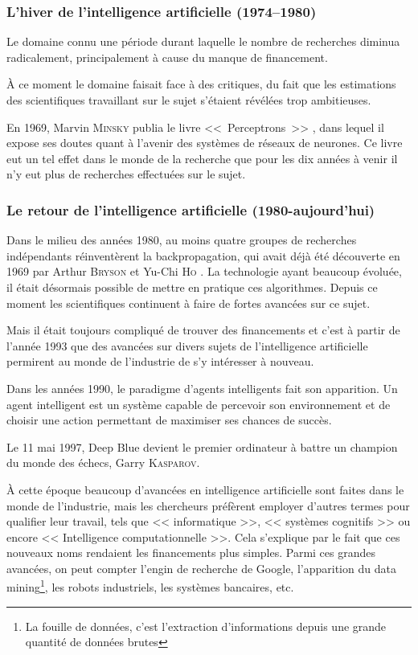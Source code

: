 \subsubsection{L'hiver de l'intelligence artificielle (1974–1980)}

Le domaine connu une période durant laquelle le nombre de recherches diminua radicalement, principalement à cause du manque de financement.

À ce moment le domaine faisait face à des critiques, du fait que les estimations des scientifiques travaillant sur le sujet s'étaient révélées trop ambitieuses.

En 1969, Marvin \textsc{Minsky} publia le livre <<~Perceptrons~>> \cite{perceptrons}, dans lequel il expose ses doutes quant à l'avenir des systèmes de réseaux de neurones.
Ce livre eut un tel effet dans le monde de la recherche que pour les dix années à venir il n'y eut plus de recherches effectuées sur le sujet.

\subsubsection{Le retour de l'intelligence artificielle (1980-aujourd'hui)}

Dans le milieu des années 1980, au moins quatre groupes de recherches indépendants réinventèrent la backpropagation, qui avait déjà été découverte en 1969 par Arthur \textsc{Bryson} et Yu-Chi \textsc{Ho} \cite{bryson_ho}.
La technologie ayant beaucoup évoluée, il était désormais possible de mettre en pratique ces algorithmes.
Depuis ce moment les scientifiques continuent à faire de fortes avancées sur ce sujet.

Mais il était toujours compliqué de trouver des financements et c'est à partir de l'année 1993 que des avancées sur divers sujets de l'intelligence artificielle permirent au monde de l'industrie de s'y intéresser à nouveau.

Dans les années 1990, le paradigme d'agents intelligents fait son apparition.
Un agent intelligent est un système capable de percevoir son environnement et de choisir une action permettant de maximiser ses chances de succès.

Le 11 mai 1997, Deep Blue devient le premier ordinateur à battre un champion du monde des échecs, Garry \textsc{Kasparov}.

À cette époque beaucoup d'avancées en intelligence artificielle sont faites dans le monde de l'industrie, mais les chercheurs préfèrent employer d'autres termes pour qualifier leur travail, tels que << informatique >>, << systèmes cognitifs >> ou encore << Intelligence computationnelle >>.
Cela s'explique par le fait que ces nouveaux noms rendaient les financements plus simples.
Parmi ces grandes avancées, on peut compter l'engin de recherche de Google, l'apparition du data mining\footnote{La fouille de données, c'est l'extraction d'informations depuis une grande quantité de données brutes}, les robots industriels, les systèmes bancaires, etc.

